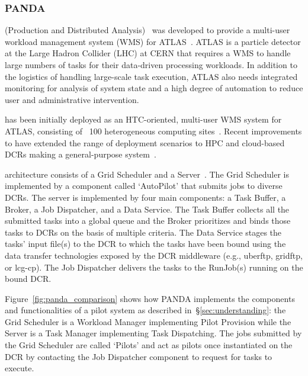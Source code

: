 \documentclass{sig-alternate}
\begin{document}





%
\subsubsection{PANDA}
\label{sec:panda}

\panda (Production and Distributed Analysis)~\cite{zhao2011panda} was
developed to provide a multi-user workload management system (WMS) for
ATLAS~\cite{aad2008atlas}. ATLAS is a particle detector at the Large Hadron
Collider (LHC) at CERN that requires a WMS to handle large numbers of tasks for
their data-driven processing workloads. In addition to the logistics of handling
large-scale task execution, ATLAS also needs integrated monitoring for analysis
of system state and a high degree of automation to reduce user and
administrative intervention.

\panda has been initially deployed as an HTC-oriented, multi-user WMS system for
ATLAS, consisting of ~100 heterogeneous computing sites~\cite{maeno2012pd2p}.
Recent improvements to \panda have extended the range of deployment scenarios to
HPC and cloud-based DCRs making \panda a general-purpose \pilot
system~\cite{nilsson2012recentrp}.

\panda architecture consists of a Grid Scheduler and a \panda
Server~\cite{panda_architecture_url,maeno2011overview}. The Grid Scheduler is
implemented by a component called `AutoPilot' that submits jobs to diverse DCRs.
The \panda server is implemented by four main components: a Task Buffer, a
Broker, a Job Dispatcher, and a Data Service. The Task Buffer collects all the
submitted tasks into a global queue and the Broker prioritizes and binds those
tasks to DCRs on the basis of multiple criteria. The Data Service stages the
tasks' input file(s) to the DCR to which the tasks have been bound using the
data transfer technologies exposed by the DCR middleware (e.g., uberftp,
gridftp, or lcg-cp). The Job Dispatcher delivers the tasks to the RunJob(s)
running on the bound DCR.

Figure~\ref{fig:panda_comparison} shows how PANDA implements the components and
functionalities of a pilot system as described in~\S\ref{sec:understanding}: the
Grid Scheduler is a Workload Manager implementing Pilot Provision while the
\panda Server is a Task Manager implementing Task Dispatching. The jobs
submitted by the Grid Scheduler are called `Pilots' and act as pilots once
instantiated on the DCR by contacting the Job Dispatcher component to request
for tasks to execute.
\end{document}
